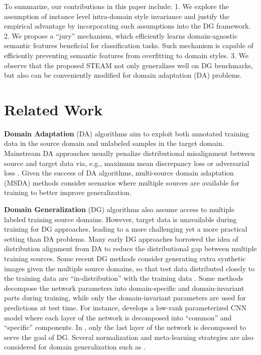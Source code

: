 \documentclass[10pt,twocolumn,letterpaper]{article}
\newcommand{\0}{{\bf 0}}
\begin{document}
To summarize, our contributions in this paper include: 1. We explore the assumption of instance level intra-domain style invariance and justify the empirical advantage by incorporating such assumptions into the DG framework. 2. We propose a ``jury'' mechanism, which efficiently learns domain-agnostic semantic features beneficial for classification tasks. Such mechanism is capable of efficiently preventing semantic features from overfitting to domain styles. 3. We observe that the proposed STEAM not only generalizes well on DG benchmarks, but also can be conveniently modified for domain adaptation (DA) problems.

\section{Related Work}
\textbf{Domain Adaptation} (DA) algorithms aim to exploit both annotated training data in the source domain and unlabeled samples in the target domain. Mainstream DA approaches  \cite{cai2019exploring,chen2019mocycle,pan2019transferrable,pan2020exploring,yao2015semi} usually penalize distributional misalignment between source and target data via, e.g., maximum mean discrepancy loss \cite{long2015learning,long2017deep} or adversarial loss \cite{bousmalis2017unsupervised, long2018conditional, sankaranarayanan2018generate}. Given the success of DA algorithms, multi-source domain adaptation (MSDA) methods \cite{peng2019moment, xu2018deep, zhao2018adversarial} consider scenarios where multiple sources are available for training to better improve generalization.

\textbf{Domain Generalization} (DG) algorithms also assume access to multiple labeled training source domains. However, target data is unavailable during training for DG approaches, leading to a more challenging yet a more practical setting than DA problems. Many early DG approaches \cite{ li2018domain, li2018deep, motiian2017unified} borrowed the idea of distribution alignment from DA to reduce the distributional gap between multiple training sources. Some recent DG methods consider generating extra synthetic images given the multiple source domains, so that test data distributed closely to the training data are ``in-distribution'' with the training data \cite{bai2020decaug, shankar2018generalizing, somavarapu2020frustratingly, zhou2020learning}. Some methods decompose the network parameters into domain-specific and domain-invariant parts during training, while only the domain-invariant parameters are used for predictions at test time. For instance, \cite{li2017deeper} develops a low-rank parameterized CNN model where each layer of the network is decomposed into ``common'' and ``specific'' components. In \cite{piratla2020efficient}, only the last layer of the network is decomposed to serve the goal of DG. Several normalization and meta-learning strategies are also considered for domain generalization such as \cite{li2019episodic, seo2019learning, zhou2021domain}.
\end{document}
